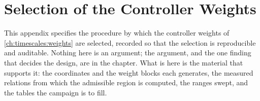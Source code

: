 \chapter{Selection of the Controller Weights}\label{ch:app_bo}
\label{ch:app_wsel}%
%
%
%
%

This appendix specifies the procedure by which the controller weights of \cref{ch:timescales:weights} are selected, recorded so that the selection is reproducible and auditable.
Nothing here is an argument; the argument, and the one finding that decides the design, are in the chapter.
What is here is the material that supports it: the coordinates and the weight blocks each generates, the measured relations from which the admissible region is computed, the ranges swept, and the tables the campaign is to fill.


